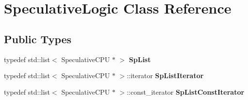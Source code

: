 \hypertarget{classSpeculativeLogic}{
\section{SpeculativeLogic Class Reference}
\label{classSpeculativeLogic}
}
\subsection*{Public Types}
\begin{DoxyCompactItemize}
\item 
\hypertarget{classSpeculativeLogic_a2461a666684d4cdcf00181732a8688b3}{
typedef std::list$<$ SpeculativeCPU $\ast$ $>$ {\bfseries SpList}}
\label{classSpeculativeLogic_a2461a666684d4cdcf00181732a8688b3}

\item 
\hypertarget{classSpeculativeLogic_a0f88679e7c8857e42f0d80838ea7cf5c}{
typedef std::list$<$ SpeculativeCPU $\ast$ $>$::iterator {\bfseries SpListIterator}}
\label{classSpeculativeLogic_a0f88679e7c8857e42f0d80838ea7cf5c}

\item 
\hypertarget{classSpeculativeLogic_aa34206026defbc01f2dc57f5a8ff0c67}{
typedef std::list$<$ SpeculativeCPU $\ast$ $>$::const\_\-iterator {\bfseries SpListConstIterator}}
\label{classSpeculativeLogic_aa34206026defbc01f2dc57f5a8ff0c67}

\end{DoxyCompactItemize}
